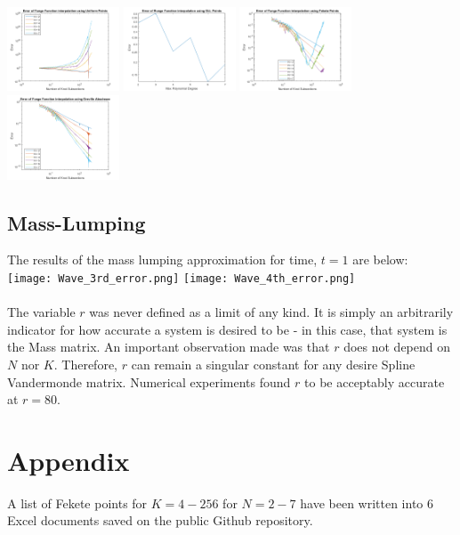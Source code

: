 \documentclass{article}
\begin{document}
\hspace*{-0.5cm}\includegraphics[height = 2.5cm]{RungeUniform.png} \includegraphics[height = 2.5cm]{RungeGLL.png}
\includegraphics[height = 2.5cm]{RungeFekete.png} \includegraphics[height = 2.5cm]{RungeGreville.png}

\subsection*{Mass-Lumping}
The results of the mass lumping approximation for time, $t=1$ are below:
\newline\hspace*{-0.5cm}
\texttt{[image: Wave\_3rd\_error.png]} \texttt{[image: Wave\_4th\_error.png]}
\paragraph{}
The variable $r$ was never defined as a limit of any kind. It is simply an arbitrarily indicator for how accurate a system is desired to be - in this case, that system is the Mass matrix. An important observation made was that $r$ does not depend on $N$ nor $K$. Therefore, $r$ can remain a singular constant for any desire Spline Vandermonde matrix. Numerical experiments found $r$ to be acceptably accurate at $r=80$.


\section*{Appendix}
A list of Fekete points for $K=4-256$ for $N=2-7$ have been written into 6 Excel documents saved on the public Github repository.
\end{document}
